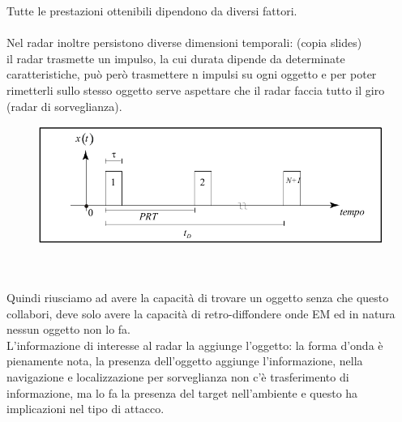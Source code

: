 \documentclass[oneside, 12pt]{extbook}
\begin{document}
Tutte le prestazioni ottenibili dipendono da diversi fattori.\\\\
Nel radar inoltre persistono diverse dimensioni temporali: (copia slides)\\
il radar trasmette un impulso, la cui durata dipende da determinate caratteristiche, può però trasmettere n impulsi su ogni oggetto e per poter rimetterli sullo stesso oggetto serve aspettare che il radar faccia tutto il giro (radar di sorveglianza).\\
\begin{figure}[!h]
	\includegraphics[scale=0.5]{immagini/localization/tempi_radar.png}
\end{figure}\\\\
Quindi riusciamo ad avere la capacità di trovare un oggetto senza che questo collabori, deve solo avere la capacità di retro-diffondere onde EM ed in natura nessun oggetto non lo fa.\\
L'informazione di interesse al radar la aggiunge l'oggetto: la forma d'onda è pienamente nota, la presenza dell'oggetto aggiunge l'informazione, nella navigazione e localizzazione per sorveglianza non c'è trasferimento di informazione, ma lo fa la presenza del target nell'ambiente e questo ha implicazioni nel tipo di attacco.\\
\end{document}
